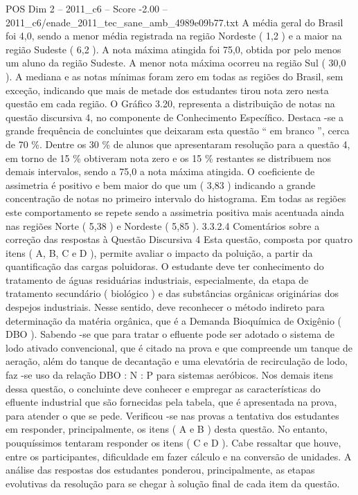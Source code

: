 \begin{textsample}{POS Dim 2 – 2011\_c6 – Score -2.00 – 2011\_c6/enade\_2011\_tec\_sane\_amb\_4989e09b77.txt}
A média geral do Brasil foi 4,0, sendo a menor média registrada na região Nordeste ( 1,2 ) e a maior na região Sudeste ( 6,2 ).
A nota máxima atingida foi 75,0, obtida por pelo menos um aluno da região Sudeste.
A menor nota máxima ocorreu na região Sul ( 30,0 ).
A mediana e as notas mínimas foram zero em todas as regiões do Brasil, sem exceção, indicando que mais de metade dos estudantes tirou nota zero nesta questão em cada região.
O Gráfico 3.20, representa a distribuição de notas na questão discursiva 4, no componente de Conhecimento Específico.
Destaca -se a grande frequência de concluintes que deixaram esta questão “ em branco ”, cerca de 70 \%.
Dentre os 30 \% de alunos que apresentaram resolução para a questão 4, em torno de 15 \% obtiveram nota zero e os 15 \% restantes se distribuem nos demais intervalos, sendo a 75,0 a nota máxima atingida.
O coeficiente de assimetria é positivo e bem maior do que um ( 3,83 ) indicando a grande concentração de notas no primeiro intervalo do histograma.
Em todas as regiões este comportamento se repete sendo a assimetria positiva mais acentuada ainda nas regiões Norte ( 5,38 ) e Nordeste ( 5,85 ). 3.3.2.4 Comentários sobre a correção das respostas à Questão Discursiva 4 Esta questão, composta por quatro itens ( A, B, C e D ), permite avaliar o impacto da poluição, a partir da quantificação das cargas poluidoras.
O estudante deve ter conhecimento do tratamento de águas residuárias industriais, especialmente, da etapa de tratamento secundário ( biológico ) e das substâncias orgânicas originárias dos despejos industriais.
Nesse sentido, deve reconhecer o método indireto para determinação da matéria orgânica, que é a Demanda Bioquímica de Oxigênio ( DBO ).
Sabendo -se que para tratar o efluente pode ser adotado o sistema de lodo ativado convencional, que é citado na prova e que compreende um tanque de aeração, além do tanque de decantação e uma elevatória de recirculação de lodo, faz -se uso da relação DBO : N : P para sistemas aeróbicos.
Nos demais itens dessa questão, o concluinte deve conhecer e empregar as características do efluente industrial que são fornecidas pela tabela, que é apresentada na prova, para atender o que se pede.
Verificou -se nas provas a tentativa dos estudantes em responder, principalmente, os itens ( A e B ) desta questão.
No entanto, pouquíssimos tentaram responder os itens ( C e D ).
Cabe ressaltar que houve, entre os participantes, dificuldade em fazer cálculo e na conversão de unidades.
A análise das respostas dos estudantes ponderou, principalmente, as etapas evolutivas da resolução para se chegar à solução final de cada item da questão.

\end{textsample}
